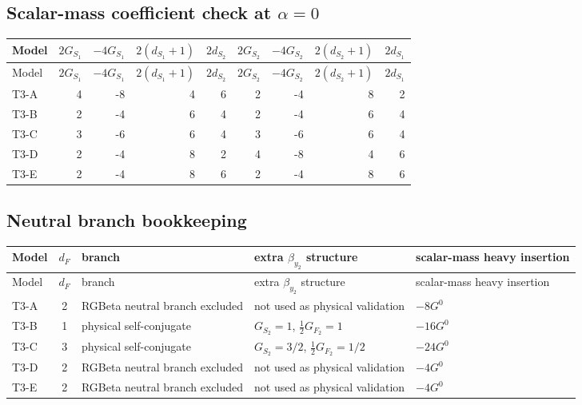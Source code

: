 \documentclass[11pt]{article}
\begin{document}
\subsection*{Scalar-mass coefficient check at $\alpha=0$}
\begin{center}
\small
\begin{longtable}{@{}lrrrrrrrr@{}}
\toprule
Model & $2G_{S_1}$ & $-4G_{S_1}$ & $2(d_{S_1}+1)$ & $2d_{S_2}$ & $2G_{S_2}$ & $-4G_{S_2}$ & $2(d_{S_2}+1)$ & $2d_{S_1}$ \\
\midrule
\endfirsthead
\toprule
Model & $2G_{S_1}$ & $-4G_{S_1}$ & $2(d_{S_1}+1)$ & $2d_{S_2}$ & $2G_{S_2}$ & $-4G_{S_2}$ & $2(d_{S_2}+1)$ & $2d_{S_1}$ \\
\midrule
\endhead
T3-A & 4 & -8 & 4 & 6 & 2 & -4 & 8 & 2 \\
T3-B & 2 & -4 & 6 & 4 & 2 & -4 & 6 & 4 \\
T3-C & 3 & -6 & 6 & 4 & 3 & -6 & 6 & 4 \\
T3-D & 2 & -4 & 8 & 2 & 4 & -8 & 4 & 6 \\
T3-E & 2 & -4 & 8 & 6 & 2 & -4 & 8 & 6 \\
\bottomrule
\end{longtable}
\end{center}
\subsection*{Neutral branch bookkeeping}
\begin{center}
\small
\begin{longtable}{@{}lclp{5.5cm}l@{}}
\toprule
Model & $d_F$ & branch & extra $\beta_{y_2}$ structure & scalar-mass heavy insertion \\
\midrule
\endfirsthead
\toprule
Model & $d_F$ & branch & extra $\beta_{y_2}$ structure & scalar-mass heavy insertion \\
\midrule
\endhead
T3-A & 2 & RGBeta neutral branch excluded & not used as physical validation & $-8G^0$ \\
T3-B & 1 & physical self-conjugate & $G_{S_2}=1$, $\frac12G_{F_2}=1$ & $-16G^0$ \\
T3-C & 3 & physical self-conjugate & $G_{S_2}=3/2$, $\frac12G_{F_2}=1/2$ & $-24G^0$ \\
T3-D & 2 & RGBeta neutral branch excluded & not used as physical validation & $-4G^0$ \\
T3-E & 2 & RGBeta neutral branch excluded & not used as physical validation & $-4G^0$ \\
\bottomrule
\end{longtable}
\end{center}
\end{document}
